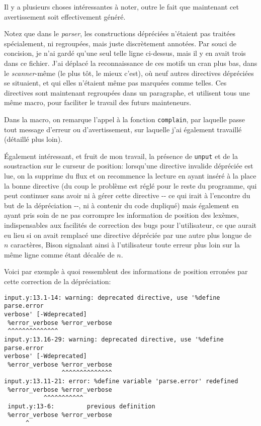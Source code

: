 \documentclass[a4paper,11pt,twoside,final]{article}
\begin{document}
  Il y a plusieurs choses intéressantes à noter, outre le fait que maintenant
  cet avertissement soit effectivement généré.

  Notez que dans le \textit{parser}, les constructions dépréciées n'étaient pas
  traitées spécialement, ni regroupées, mais juste discrètement annotées. Par
  souci de concision, je n'ai gardé qu'une seul telle ligne ci-dessus, mais il
  y en avait trois dans ce fichier. J'ai déplacé la reconnaissance de ces
  motifs un cran plus bas, dans le \textit{scanner}-même (le plus tôt, le
  mieux c'est), où neuf autres directives dépréciées se situaient, et qui elles
  n'étaient même pas marquées comme telles. Ces directives sont maintenant
  regroupées dans un paragraphe, et utilisent tous une même macro, pour
  faciliter le travail des futurs mainteneurs.

  Dans la macro, on remarque l'appel à la fonction \texttt{complain}, par
  laquelle passe tout message d'erreur ou d'avertissement, sur laquelle j'ai
  également travaillé (détaillé plus loin).

  Également intéressant, et fruit de mon travail, la présence de \texttt{unput}
  et de la soustraction sur le curseur de position: lorsqu'une directive
  invalide dépréciée est lue, on la supprime du flux et on recommence la
  lecture en ayant inséré à la place la bonne directive (du coup le problème est
  réglé pour le reste du programme, qui peut continuer sans avoir ni à gérer
  cette directive -{}- ce qui irait à l'encontre du but de la dépréciation
  -{}-, ni à contenir du code dupliqué) mais également en ayant pris soin de ne
  pas corrompre les information de position des lexèmes, indispensables aux
  facilités de correction des bugs pour l'utilisateur, ce que aurait eu lieu si
  on avait remplacé une directive dépréciée par une autre plus longue de $n$
  caractères, Bison signalant ainsi à l'utilisateur toute erreur plus loin sur
  la même ligne comme étant décalée de $n$.

  Voici par exemple à quoi ressemblent des informations de position erronées
  par cette correction de la dépréciation:

  \begin{verbatim}
input.y:13.1-14: warning: deprecated directive, use '%define parse.error
verbose' [-Wdeprecated]
 %error_verbose %error_verbose
 ^^^^^^^^^^^^^^
input.y:13.16-29: warning: deprecated directive, use '%define parse.error
verbose' [-Wdeprecated]
 %error_verbose %error_verbose
                ^^^^^^^^^^^^^^
input.y:13.11-21: error: %define variable 'parse.error' redefined
 %error_verbose %error_verbose
           ^^^^^^^^^^^
 input.y:13-6:         previous definition
 %error_verbose %error_verbose
      ^
  \end{verbatim}
\end{document}
